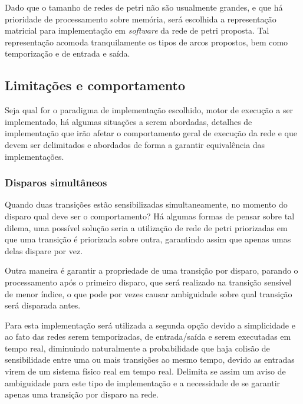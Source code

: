 Dado que o tamanho de redes de petri não são usualmente grandes, e que há prioridade de processamento sobre memória, será escolhida a representação matricial para implementação em \textit{software} da rede de petri proposta. Tal representação acomoda tranquilamente os tipos de arcos propostos, bem como temporização e de entrada e saída.



\subsection{Limitações e comportamento}
\label{section:limitations}

Seja qual for o paradigma de implementação escolhido, motor de execução a ser implementado, há algumas situações a serem abordadas, detalhes de implementação que irão afetar o comportamento geral de execução da rede e que devem ser delimitados e abordados de forma a garantir equivalência das implementações.

\subsubsection{Disparos simultâneos}

Quando duas transições estão sensibilizadas simultaneamente, no momento do disparo qual deve ser o comportamento? Há algumas formas de pensar sobre tal dilema, uma possível solução seria a utilização de rede de petri priorizadas em que uma transição é priorizada sobre outra, garantindo assim que apenas umas delas dispare por vez.

Outra maneira é garantir a propriedade de uma transição por disparo, parando o processamento após o primeiro disparo, que será realizado na transição sensível de menor índice, o que pode por vezes causar ambiguidade sobre qual transição será disparada antes.

Para esta implementação será utilizada a segunda opção devido a simplicidade e ao fato das redes serem temporizadas, de entrada/saída e serem executadas em tempo real, diminuindo naturalmente a probabilidade que haja colisão de sensibilidade entre uma ou mais transições ao mesmo tempo, devido as entradas virem de um sistema físico real em tempo real. Delimita se assim um aviso de ambiguidade para este tipo de implementação e a necessidade de se garantir apenas uma transição por disparo na rede.


